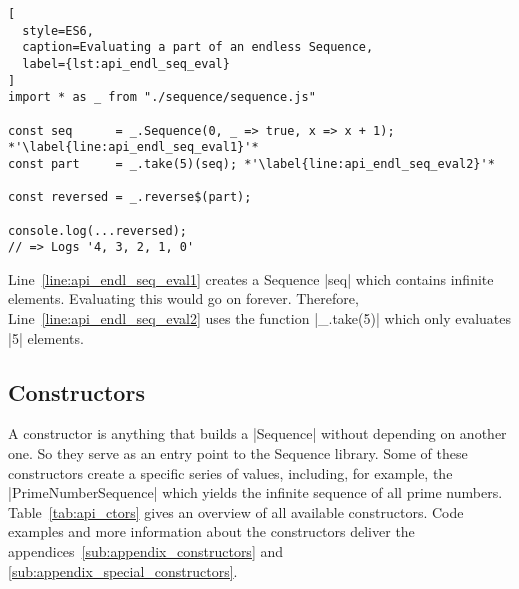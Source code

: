 \begin{lstlisting}[
  style=ES6,
  caption=Evaluating a part of an endless Sequence,
  label={lst:api_endl_seq_eval}
]
import * as _ from "./sequence/sequence.js"

const seq      = _.Sequence(0, _ => true, x => x + 1); *'\label{line:api_endl_seq_eval1}'*
const part     = _.take(5)(seq); *'\label{line:api_endl_seq_eval2}'*

const reversed = _.reverse$(part);

console.log(...reversed);
// => Logs '4, 3, 2, 1, 0'
\end{lstlisting}

Line~\ref{line:api_endl_seq_eval1} creates a Sequence |seq| which contains
infinite elements. Evaluating this would go on forever. Therefore,
Line~\ref{line:api_endl_seq_eval2} uses the function |_.take(5)| which only
evaluates |5| elements.

\label{sec:api_sequences}
\subsection{Constructors} %
\label{sub:api_Constructors}
A constructor is anything that builds a |Sequence| without depending on another
one. So they serve as an entry point to the Sequence library. Some of these
constructors create a specific series of values, including, for example, the
|PrimeNumberSequence| which yields the infinite sequence of all prime
numbers.\\
Table~\ref{tab:api_ctors} gives an overview of all available constructors. Code
examples and more information about the constructors deliver the
appendices~\ref{sub:appendix_constructors} and
\ref{sub:appendix_special_constructors}.

